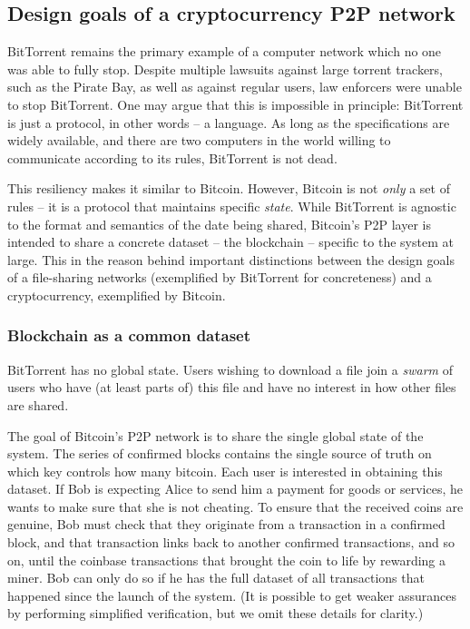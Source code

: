 \subsection{Design goals of a cryptocurrency P2P network}

BitTorrent remains the primary example of a computer network which no one was able to fully stop.
Despite multiple lawsuits against large torrent trackers, such as the Pirate Bay, as well as against regular users, law enforcers were unable to stop BitTorrent.
One may argue that this is impossible in principle: BitTorrent is just a protocol, in other words -- a language.
As long as the specifications are widely available, and there are two computers in the world willing to communicate according to its rules, BitTorrent is not dead.

This resiliency makes it similar to Bitcoin.
However, Bitcoin is not \textit{only} a set of rules -- it is a protocol that maintains specific \textit{state}.
While BitTorrent is agnostic to the format and semantics of the date being shared, Bitcoin's P2P layer is intended to share a concrete dataset -- the blockchain -- specific to the system at large.
This in the reason behind important distinctions between the design goals of a file-sharing networks (exemplified by BitTorrent for concreteness) and a cryptocurrency, exemplified by Bitcoin.


\subsubsection{Blockchain as a common dataset}

BitTorrent has no global state.
Users wishing to download a file join a \textit{swarm} of users who have (at least parts of) this file and have no interest in how other files are shared.

The goal of Bitcoin's P2P network is to share the single global state of the system.
The series of confirmed blocks contains the single source of truth on which key controls how many bitcoin.
Each user is interested in obtaining this dataset.
If Bob is expecting Alice to send him a payment for goods or services, he wants to make sure that she is not cheating.
To ensure that the received coins are genuine, Bob must check that they originate from a transaction in a confirmed block, and that transaction links back to another confirmed transactions, and so on, until the coinbase transactions that brought the coin to life by rewarding a miner.
Bob can only do so if he has the full dataset of all transactions that happened since the launch of the system.
(It is possible to get weaker assurances by performing simplified verification, but we omit these details for clarity.)

